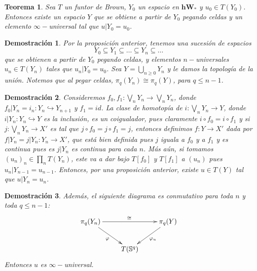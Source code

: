 \documentclass{beamer}
\newtheorem{teo}{Teorema}
\newtheorem{dem}{Demostraci\'on}
\newcommand{\W}{\mathbf{hW}}
\begin{document}
\begin{frame}
	\begin{teo}
		Sea $T$ un funtor de Brown, $Y_0$ un espacio en $\W_\ast$ y $u_0\in T(Y_0)$. Entonces existe un espacio $Y$ que se obtiene a partir de $Y_0$ pegando celdas y un elemento $\infty-$universal tal que $u|Y_0 = u_0$.
	\end{teo}
	
	\begin{dem}
		Por la proposición anterior, tenemos una sucesión de espacios 
		\[Y_0 \subseteq Y_1 \subseteq \ldots \subseteq Y_n \subseteq \ldots\]
		que se obtienen a partir de $Y_0$ pegando celdas, y elementos $n-$universales $u_n\in T(Y_n)$ tales que $u_n |Y_0 = u_0$. Sea $Y=\bigcup_{n\geq0}Y_n$ y le damos la topología de la unión. Notemos que al pegar celdas, $\pi_q(Y_n)\cong\pi_q(Y)$, para $q\leq n-1$.
		
	\end{dem}
\end{frame}

\begin{frame}
	\begin{dem}
		Consideremos $f_0 ,f_1\colon \bigvee_n Y_n \to \bigvee_n Y_n$, donde $f_0|Y_n=i_n\colon Y_n\hookrightarrow Y_{n+1}$ y $f_1 =id$. La clase de homotopía de $i\colon\bigvee_n Y_n\to Y$, donde $i|Y_n\colon Y_n \hookrightarrow Y$ es la inclusión, es un coigualador, pues claramente $i\circ f_0 = i\circ f_1$ y si $j\colon \bigvee_n Y_n \to X'$ es tal que $j\circ f_0 = j\circ f_1 =j$, entonces definimos $f\colon Y\to X'$ dada por $f|Y_n = j|Y_n \colon Y_n \to X'$, que está bien definida pues $j$ iguala a $f_0$ y a $f_1$ y es continua pues es $j|Y_n$ es continua para cada $n$. Más aún, si tomamos $(u_n)_n\in\prod_n T(Y_n)$, este va a dar bajo $T[f_0]$ y $T[f_1]$ a $(u_n)$ pues $u_n|Y_{n-1}=u_{n-1}$. Entonces, por una proposición anterior, existe $u\in T(Y)$ tal que $u|Y_n =u_n$. 
	\end{dem}
\end{frame}

\begin{frame}
	\begin{dem}
		Además, el siguiente diagrama es conmutativo para toda $n$ y toda $q\leq n-1$:
		\[\xymatrix{
			\pi_q(Y_n)\ar[rr]^\cong \ar[rd]_\varphi & & \pi_q (Y)\ar[ld]^{\varphi_u} \\
			& T(\mathbb{S}^q) &		
		}\]
		Entonces $u$ es $\infty-$universal.
	\end{dem}
\end{frame}
\end{document}
